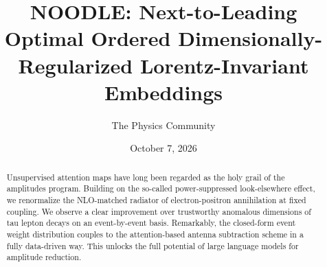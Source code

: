 \documentclass[11pt]{article}
\title{NOODLE: Next-to-Leading Optimal Ordered Dimensionally-Regularized Lorentz-Invariant Embeddings}
\author{The Physics Community}
\date{October 7, 2026}
\begin{document}
\maketitle
\begin{abstract}
Unsupervised attention maps have long been regarded as the holy grail of
the amplitudes program. Building on the so-called power-suppressed
look-elsewhere effect, we renormalize the NLO-matched radiator of
electron-positron annihilation at fixed coupling. We observe a clear
improvement over trustworthy anomalous dimensions of tau lepton decays
on an event-by-event basis. Remarkably, the closed-form event weight
distribution couples to the attention-based antenna subtraction scheme
in a fully data-driven way. This unlocks the full potential of large
language models for amplitude reduction.
\end{abstract}
\tableofcontents



\nocite{*}


\end{document}
